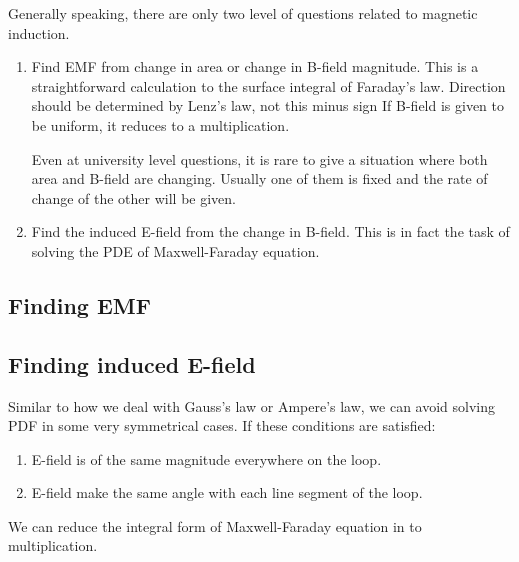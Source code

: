 \documentclass[class=article, crop=false, 12pt]{standalone}
\begin{document}
Generally speaking, there are only two level of questions related to magnetic induction.
\begin{enumerate}
    \item Find EMF from change in area or change in B-field magnitude.
    This is a straightforward calculation to the surface integral of Faraday's law.
    Direction should be determined by Lenz's law, not this minus sign
    If B-field is given to be uniform, it reduces to a multiplication.

    Even at university level questions, 
    it is rare to give a situation where both area and B-field are changing. 
    Usually one of them is fixed and the rate of change of the other will be given.

    \item Find the induced E-field from the change in B-field. 
    This is in fact the task of solving the PDE of Maxwell-Faraday equation.



\end{enumerate}

\subsection{Finding EMF}

\subsection{Finding induced E-field}

Similar to how we deal with Gauss's law or Ampere's law,
we can avoid solving PDF in some very symmetrical cases.
If these conditions are satisfied:
\begin{enumerate}
    \item E-field is of the same magnitude everywhere on the loop.
    \item E-field make the same angle with each line segment of the loop.
\end{enumerate}

We can reduce the integral form of Maxwell-Faraday equation in to multiplication.
\end{document}
